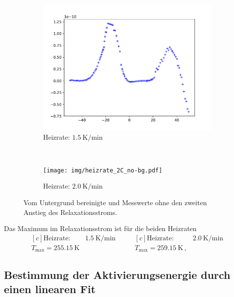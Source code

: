 \begin{figure}[htp]
    \centering
    \begin{subfigure}[t]{0.5\textwidth}
        \centering
        \includegraphics[width=\textwidth]{img/heizrate_15C_no-bg.pdf}
        \caption{Heizrate: $\SI{1.5}{\kelvin\per\minute}$}
    \end{subfigure}%
    ~
    \begin{subfigure}[t]{0.5\textwidth}
        \centering
        \texttt{[image: img/heizrate\_2C\_no-bg.pdf]}
        \caption{Heizrate: $\SI{2.0}{\kelvin\per\minute}$}
    \end{subfigure}
    \caption{Vom Untergrund bereinigte und Messwerte ohne den zweiten Anstieg des Relaxationsstroms.}
    \label{fig:no-bg}
\end{figure}

Das Maximum im Relaxationsstrom ist für die beiden Heizraten
\begin{equation*}
\begin{aligned}[c]
  \text{Heizrate: }& \SI{1.5}{\kelvin\per\minute}\\
  T_\text{max} = \SI{255.15}{\kelvin}
\end{aligned}
\qquad
\begin{aligned}[c]
  \text{Heizrate: }& \SI{2.0}{\kelvin\per\minute}\\
  T_\text{max} = \SI{259.15}{\kelvin}\,,
\end{aligned}
\end{equation*}

\subsection{Bestimmung der Aktivierungsenergie durch einen linearen Fit}
\label{sec:lin}

